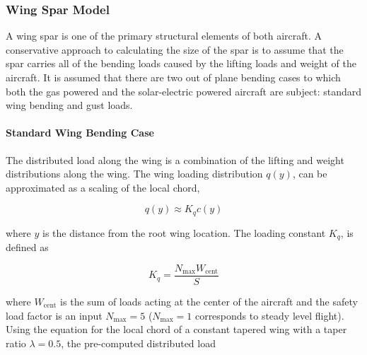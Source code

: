 \subsubsection{Wing Spar Model}

A wing spar is one of the primary structural elements of both aircraft. 
A conservative approach to calculating the size of the spar is to assume that the spar carries all of the bending loads caused by the lifting loads and weight of the aircraft.  
It is assumed that there are two out of plane bending cases to which both the gas powered and the solar-electric powered aircraft are subject: standard wing bending and gust loads. 


\paragraph{\textbf{Standard Wing Bending Case}} 
The distributed load along the wing is a combination of the lifting and weight distributions along the wing.
The wing loading distribution $q(y)$, can be approximated as a scaling of the local chord,\cite{bending}

\begin{equation}
    \label{e:wingloading}
    q(y) \approx K_q c(y) 
\end{equation}

where $y$ is the distance from the root wing location. The loading constant $K_q$\cite{bending}, is defined as

\begin{equation}
    \label{e:kq}
    K_q = \frac{N_{\text{max}}W_{\text{cent}}}{S}
\end{equation}

where $W_{\text{cent}}$ is the sum of loads acting at the center of the aircraft and the safety load factor is an input $N_{\text{max}}=5$ ($N_{\text{max}}=1$ corresponds to steady level flight). Using the equation for the local chord of a constant tapered wing\cite{bending} with a taper ratio $\lambda=0.5$, the pre-computed distributed load 



